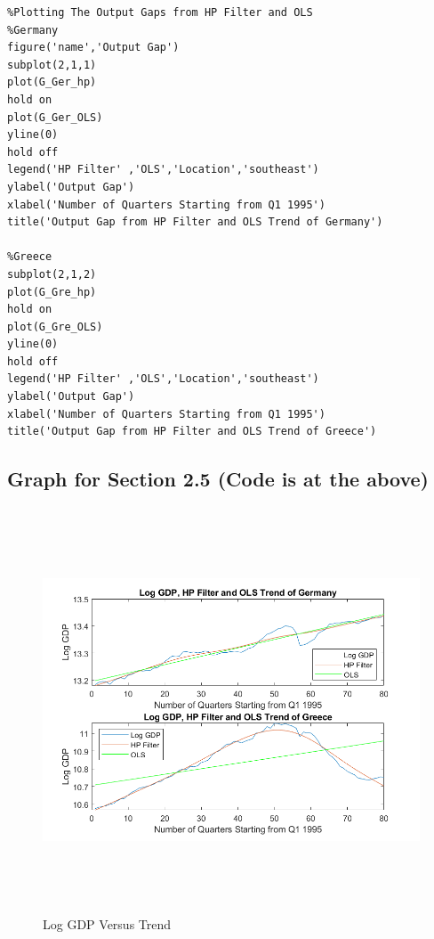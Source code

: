 \documentclass[12pt]{report}
\begin{document}
\begin{lstlisting}
%Plotting The Output Gaps from HP Filter and OLS
%Germany
figure('name','Output Gap')
subplot(2,1,1)
plot(G_Ger_hp)
hold on
plot(G_Ger_OLS)
yline(0)
hold off
legend('HP Filter' ,'OLS','Location','southeast')
ylabel('Output Gap')
xlabel('Number of Quarters Starting from Q1 1995')
title('Output Gap from HP Filter and OLS Trend of Germany')

%Greece
subplot(2,1,2)
plot(G_Gre_hp)
hold on
plot(G_Gre_OLS)
yline(0)
hold off
legend('HP Filter' ,'OLS','Location','southeast')
ylabel('Output Gap')
xlabel('Number of Quarters Starting from Q1 1995')
title('Output Gap from HP Filter and OLS Trend of Greece')

\end{lstlisting}

\subsection*{Graph for Section 2.5 (Code is at the above)}

\begin{figure}[h]
\includegraphics[height=12cm, width=\textwidth]{fig2_1}
\caption{Log GDP Versus Trend}
\end{figure}
\end{document}
